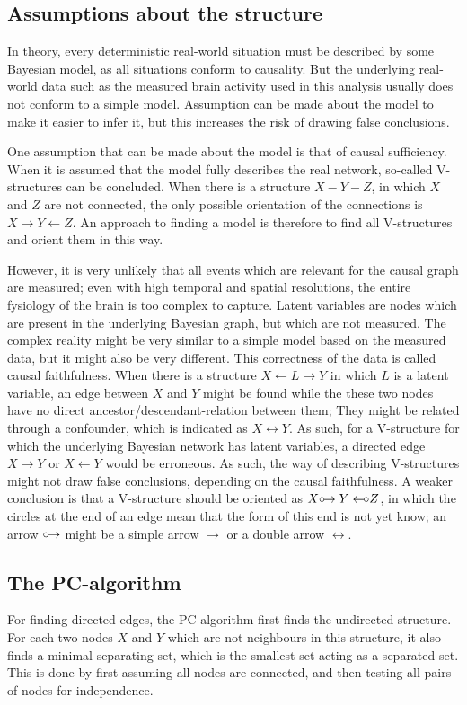 \documentclass[a4paper, 10pt, english, twocolumn]{article}
\def \orightarrow {\circ\hspace{-0.42em}\rightarrow}
\def \oleftarrow {\leftarrow\hspace{-0.42em}\circ}
\begin{document}
\subsection{Assumptions about the structure}
In theory, every deterministic real-world situation must be described by some Bayesian model, as all situations conform to causality.
But the underlying real-world data such as the measured brain activity used in this analysis usually does not conform to a simple model.
Assumption can be made about the model to make it easier to infer it, but this increases the risk of drawing false conclusions.

One assumption that can be made about the model is that of causal sufficiency. 
When it is assumed that the model fully describes the real network, so-called V-structures can be concluded. 
When there is a structure $X - Y - Z$, in which $X$ and $Z$ are not connected, the only possible orientation of the connections is $X \rightarrow Y \leftarrow Z$. %
An approach to finding a model is therefore to find all V-structures and orient them in this way.

However, it is very unlikely that all events which are relevant for the causal graph are measured; 
even with high temporal and spatial resolutions, the entire fysiology of the brain is too complex to capture.
Latent variables are nodes which are present in the underlying Bayesian graph, but which are not measured.
The complex reality might be very similar to a simple model based on the measured data, but it might also be very different.
This correctness of the data is called causal faithfulness.
When there is a structure $X \leftarrow L \rightarrow Y$ in which $L$ is a latent variable, an edge between $X$ and $Y$ might be found while the these two nodes have no direct ancestor/descendant-relation between them;
They might be related through a confounder, which is indicated as $X \leftrightarrow Y$.
As such, for a V-structure for which the underlying Bayesian network has latent variables, a directed edge $X \rightarrow Y$ or $X \leftarrow Y$ would be erroneous. 
As such, the way of describing V-structures might not draw false conclusions, depending on the causal faithfulness. 
A weaker conclusion is that a V-structure should be oriented as $X \orightarrow Y \oleftarrow Z$, in which the circles at the end of an edge mean that the form of this end is not yet know; an arrow $\orightarrow$ might be a simple arrow $\rightarrow$ or a double arrow $\leftrightarrow$.

\subsection{The PC-algorithm}
\cite{?}
For finding directed edges, the PC-algorithm first finds the undirected structure.
For each two nodes $X$ and $Y$ which are not neighbours in this structure, it also finds a minimal separating set, which is the smallest set acting as a separated set.
This is done by first assuming all nodes are connected, and then testing all pairs of nodes for independence.
\end{document}
